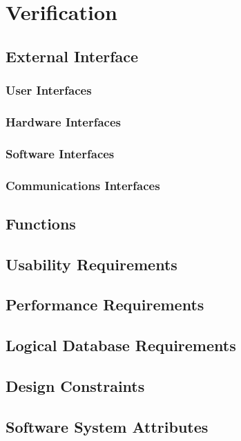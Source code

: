 \documentclass[ 10pt]{report}
\begin{document}
    \chapter{Verification}
        \section{External Interface}
            \subsection{User Interfaces}
            \subsection{Hardware Interfaces}
            \subsection{Software Interfaces}
            \subsection{Communications Interfaces}
        \section{Functions}
        \section{Usability Requirements}
        \section{Performance Requirements}
        \section{Logical Database Requirements}
        \section{Design Constraints}
        \section{Software System Attributes}
\end{document}
